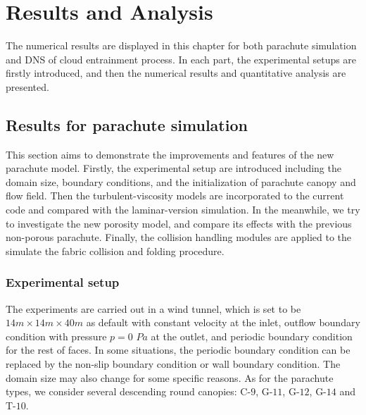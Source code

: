 \chapter{Results and Analysis}
The numerical results are displayed in this chapter for both parachute simulation and DNS of cloud entrainment process. In each part, the experimental setups are firstly introduced, and then the numerical results and quantitative analysis are presented.

\section{Results for parachute simulation}
This section aims to demonstrate the improvements and features of the new parachute model. Firstly, the experimental setup are introduced including the domain size, boundary conditions, and the initialization of parachute canopy and flow field. Then the turbulent-viscosity models are incorporated to the current code and compared with the laminar-version simulation. In the meanwhile, we try to investigate the new porosity model, and compare its effects with the previous non-porous parachute. Finally, the collision handling modules are applied to the simulate the fabric collision and folding procedure.
 
\subsection{Experimental setup}
The experiments are carried out in a wind tunnel, which is set to be $14m\times14m\times 40m$ as default with constant velocity at the inlet, outflow boundary condition with pressure $p = 0$ $Pa$ at the outlet, and periodic boundary condition for the rest of faces. In some situations, the periodic boundary condition can be replaced by the non-slip boundary condition or wall boundary condition. The domain size may also change for some specific reasons. As for the parachute types, we consider several descending round canopies: C-$9$, G-$11$, G-$12$, G-$14$ and T-$10$. 


